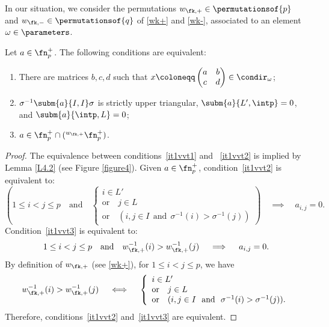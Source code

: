 In our situation, we consider the permutations $w_{\fk,+}\in\permutationsof{p}$ and $w_{\fk,-}\in\permutationsof{q}$
of \eqref{wk+} and \eqref{wk-}, associated to an element $\omega\in\parameters$.

\begin{lemma}
\label{L4.5}
Let $a\in\fn_p^+$. The following conditions are equivalent:
\begin{enumerate}[label=(\arabic*)]
\item \label{it1vvt1}There are matrices $b,c,d$ such that $x\coloneqq \begin{pmatrix} a & b\\ c & d\end{pmatrix}\in\condir_\omega$;
\item \label{it1vvt2} $\sigma^{-1}\subm{a}{I,I}\sigma$ is strictly upper triangular, $\subm{a}{L',\intp}=0$, and $\subm{a}{\intp,L}=0$;
\item\label{it1vvt3} $a\in \fn_p^+\cap({}^{w_{\fk,+}}\fn_p^+)$.
\end{enumerate}
\end{lemma}

\begin{proof}
The equivalence between conditions~\ref{it1vvt1} and ~\ref{it1vvt2} is implied by Lemma \ref{L4.2} (see Figure \ref{figure4}).
Given $a\in\fn_p^+$, condition~\ref{it1vvt2}  is equivalent to:
\begin{equation*}
\left(1\leq i<j\leq p\quad\mbox{and}\quad\left\{\begin{array}{l}
i\in L'\\ \mbox{or}\quad j\in L\\
\mbox{or}\quad(i,j\in I\ \ \mbox{and}\ \ \sigma^{-1}(i)>\sigma^{-1}(j))
\end{array}\right.\right)
\quad\implies\quad a_{i,j}=0.
\end{equation*}
Condition~\ref{it1vvt3} is equivalent to:
\begin{equation*}
1\leq i<j\leq p\quad \mbox{and}\quad w_{\fk,+}^{-1}(i)> w_{\fk,+}^{-1}(j)\quad \implies\quad  a_{i,j}=0.
\end{equation*}
By definition of $w_{\fk,+}$ (see \eqref{wk+}), for $1\leq i<j\leq p$, we have
\[w_{\fk,+}^{-1}(i)> w_{\fk,+}^{-1}(j)\quad\iff\quad \left\{\begin{array}{l}
i\in L'\\ \mbox{or}\quad j\in L\\
\mbox{or}\quad(i,j\in I\ \ \mbox{and}\ \ \sigma^{-1}(i)>\sigma^{-1}(j)).
\end{array}\right.\]
Therefore, conditions~\ref{it1vvt2} and~\ref{it1vvt3} are equivalent.
\end{proof}


